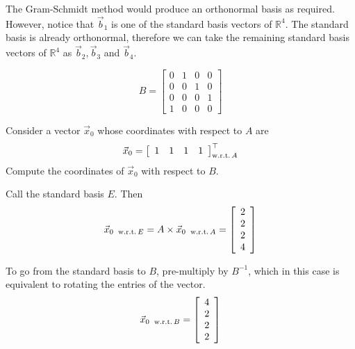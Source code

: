 \documentclass[a4paper,11pt]{exam}
\begin{document}
\begin{questions}
\begin{parts}
\begin{subparts}
            \begin{solution}
                The Gram-Schmidt method would produce an orthonormal basis as required.
                However, notice that $\vec{b}_1$ is one of the standard basis vectors of $\mathbb{R}^4$.
                The standard basis is already orthonormal,
                therefore we can take the remaining standard basis vectors of $\mathbb{R}^4$ as $\vec{b}_2, \vec{b}_3$ and $\vec{b}_4$.

                \[
                    B = \left[ \begin{array}{cccc}
                            0 & 1 & 0 & 0 \\
                            0 & 0 & 1 & 0 \\
                            0 & 0 & 0 & 1 \\
                            1 & 0 & 0 & 0
                        \end{array} \right]
                \]
            \end{solution}

            \subpart Consider a vector $\vec{x}_0$ whose coordinates with respect to $A$ are
            $$
                \vec{x}_0=\left[\begin{array}{llll}
                        1 & 1 & 1 & 1
                    \end{array}\right]_{\text {w.r.t.\,} A}^{\top}
            $$
            Compute the coordinates of $\vec{x}_0$ with respect to $B$.

            \begin{solution}
                Call the standard basis $E$. Then
                \[
                    \vec{x}_{0\; \text{ w.r.t.\,} E} = A \times \vec{x}_{0\; \text{ w.r.t.\,} A} =
                    \left[ \begin{array}{c} 2 \\ 2 \\ 2 \\ 4 \end{array} \right]
                \]

                To go from the standard basis to $B$, pre-multiply by $B^{-1}$, which in this case is equivalent to rotating the entries of the vector.
                \[
                    \vec{x}_{0\; \text{ w.r.t.\,} B} = \left[ \begin{array}{c} 4 \\ 2 \\ 2 \\ 2 \end{array} \right]
                \]


\end{solution}
\end{subparts}
\end{parts}
\end{questions}
\end{document}
